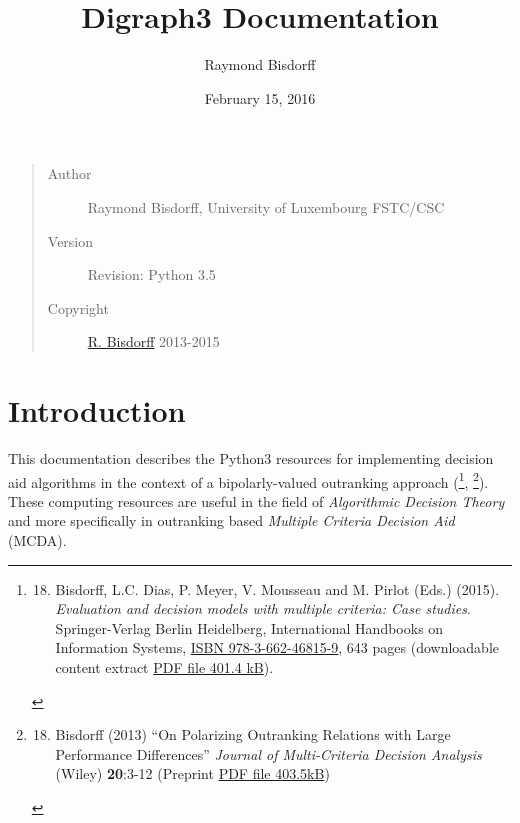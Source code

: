 \documentclass[letterpaper,10pt,english]{sphinxmanual}
\title{Digraph3 Documentation}
\date{February 15, 2016}
\author{Raymond Bisdorff}
\begin{document}
\maketitle
\tableofcontents
{}\label{index::doc}

\begin{quote}\begin{description}
\item[{Author}] \leavevmode
Raymond Bisdorff, University of Luxembourg FSTC/CSC

\item[{Version}] \leavevmode
Revision: Python 3.5

\item[{Copyright}] \leavevmode
\href{http://leopold-loewenheim.uni.lu/bisdorff/}{R. Bisdorff} 2013-2015

\end{description}\end{quote}


\chapter{Introduction}
\label{index:introduction-label}\label{index:documentation-of-the-digraph3-resources}\label{index:introduction}
This documentation describes the Python3 resources for implementing decision aid algorithms in the context of a bipolarly-valued outranking approach (\footnote{\begin{enumerate}
\setcounter{enumi}{17}
\item {} 
Bisdorff, L.C. Dias, P. Meyer, V. Mousseau and M. Pirlot (Eds.) (2015). \emph{Evaluation and decision models with multiple criteria: Case studies}. Springer-Verlag Berlin Heidelberg, International Handbooks on Information Systems, \href{http://link.springer.com/book/10.1007/978-3-662-46816-6}{ISBN 978-3-662-46815-9}, 643 pages (downloadable content extract \href{http://leopold-loewenheim.uni.lu/bisdorff/documents/MCDAApplicationsContent.pdf}{PDF file 401.4 kB}).

\end{enumerate}
}, \footnote{\begin{enumerate}
\setcounter{enumi}{17}
\item {} 
Bisdorff (2013) ``On Polarizing Outranking Relations with Large Performance Differences'' \emph{Journal of Multi-Criteria Decision Analysis} (Wiley) \textbf{20}:3-12 (Preprint \href{http://leopold-loewenheim.uni.lu/bisdorff/documents/MCDA-10-0059-PrePeerReview.pdf}{PDF file 403.5kB})

\end{enumerate}
}). These computing resources are useful in the field of \emph{Algorithmic Decision Theory} and more specifically in outranking based \emph{Multiple Criteria Decision Aid} (MCDA).
\end{document}
